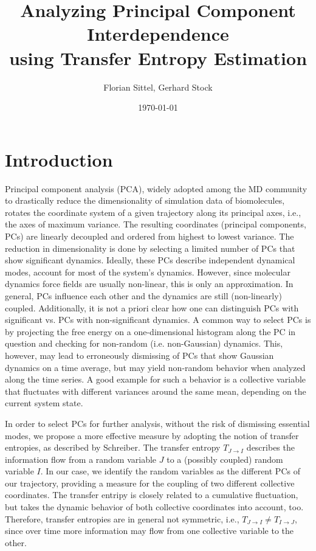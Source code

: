 \documentclass[12pt,a4paper,twoside,english,fleqn,preprint,aps,prb]{revtex4}
\begin{document}
\author{Florian Sittel, Gerhard Stock} 
\title{Analyzing Principal Component Interdependence\\ using Transfer Entropy Estimation}
\date{\today}

\begingroup
 \let\clearpage\relax
 \maketitle
\endgroup

\tableofcontents
\clearpage


\section{Introduction}
Principal component analysis (PCA), widely adopted among the MD community to drastically reduce the dimensionality
of simulation data of biomolecules, rotates the coordinate system of a given trajectory along its principal
axes, i.e., the axes of maximum variance.
The resulting coordinates (principal components, PCs) are linearly decoupled and ordered from highest to lowest variance.
The reduction in dimensionality is done by selecting a limited number of PCs that show significant dynamics.
Ideally, these PCs describe independent dynamical modes, account for most of the system's dynamics.
However, since molecular dynamics force fields are usually non-linear, this is only an approximation.
In general, PCs influence each other and the dynamics are still (non-linearly) coupled.
Additionally, it is not a priori clear how one can distinguish PCs with significant vs. PCs with non-significant dynamics.
A common way to select PCs is by projecting the free energy on a one-dimensional histogram along the PC in question and checking
for non-random (i.e. non-Gaussian) dynamics.
This, however, may lead to erroneously dismissing of PCs that show Gaussian dynamics on a time average, but may yield
non-random behavior when analyzed along the time series.
A good example for such a behavior is a collective variable that fluctuates with different variances around the same mean,
depending on the current system state.

In order to select PCs for further analysis, without the risk of dismissing essential modes, we propose a
more effective measure by adopting the notion of transfer entropies, as described by Schreiber.\cite{Schreiber2000}
The transfer entropy $T_{J \rightarrow I}$ describes the information flow from a random variable $J$ to a (possibly coupled) random variable $I$.
In our case, we identify the random variables as the different PCs of our trajectory, providing a measure for the coupling of two different collective coordinates.
The transfer entripy is closely related to a cumulative fluctuation,
but takes the dynamic behavior of both collective coordinates into account, too.
Therefore, transfer entropies are in general not symmetric, i.e., $T_{J \rightarrow I} \not= T_{I \rightarrow J}$, since over time
more information may flow from one collective variable to the other.
\end{document}
